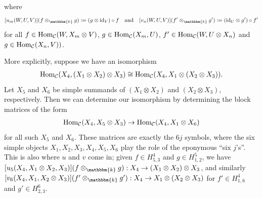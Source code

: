 \noindent where
\begin{align*}
\begin{split}
[u_m(W, U, V)](f \otimes_\mathbbm{k} g) \coloneqq (g \otimes \id_V) \circ f\quad\text{and}\quad [v_n(W, U, V)](f' \otimes_\mathbbm{k} g') \coloneqq (\id_U \otimes g') \circ f'
\end{split}
\end{align*}
\noindent for all $f \in \textup{Hom}_\mathcal{C}(W, X_m \otimes V)$, $g \in \textup{Hom}_\mathcal{C}(X_m, U)$, $f' \in \textup{Hom}_\mathcal{C}(W, U \otimes X_n)$ and $g \in \textup{Hom}_\mathcal{C}(X_n, V))$.\\
\newpage

\noindent More explicitly, suppose we have an isomorphism
\begin{align*}
\begin{split}
\homset_\mathcal{C}(X_4, (X_1 \otimes X_2) \otimes X_3) \cong \homset_\mathcal{C}(X_4, X_1 \otimes (X_2 \otimes X_3)).%
\end{split}
\end{align*}
\noindent Let $X_5$ and $X_6$ be simple summands of $(X_1 \otimes X_2)$ and $(X_2 \otimes X_3)$, respectively. Then we can determine our isomorphism by determining the block matrices of the form
\begin{align*}
\begin{split}
\textup{Hom}_\mathcal{C}(X_4, X_5 \otimes X_3) \to \textup{Hom}_\mathcal{C}(X_4, X_1 \otimes X_6)
\end{split}
\end{align*}
\noindent for all such $X_5$ and $X_6$. These matrices are exactly the $6j$ symbols, where the six simple objects $X_1, X_2, X_3, X_4, X_5, X_6$ play the role of the eponymous ``six $j$'s''. This is also where $u$ and $v$ come in; given $f \in H_{5,3}^4$ and $g \in H_{1,2}^5$, we have $[u_5(X_4, X_1 \otimes X_2, X_3)](f \otimes_\mathbbm{k} g) : X_4 \to (X_1 \otimes X_2) \otimes X_3$, and similarly $[v_6(X_4, X_1, X_2 \otimes X_3)](f' \otimes_\mathbbm{k} g') : X_4 \to X_1 \otimes (X_2 \otimes X_3)$ for $f' \in H_{1,6}^4$ and $g' \in H_{2,3}^6$.\\

